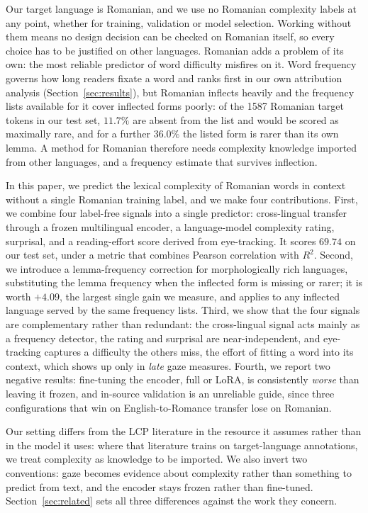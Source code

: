 Our target language is Romanian, and we use no Romanian complexity
labels at any point, whether for training, validation or model
selection. Working without them means no design decision can be checked
on Romanian itself, so every choice has to be justified on other
languages. Romanian adds a problem of its own: the most reliable
predictor of word difficulty misfires on it. Word frequency governs how
long readers fixate a word \citep{rayner1998eye} and ranks first in our
own attribution analysis (Section~\ref{sec:results}), but Romanian
inflects heavily and the frequency lists available for it cover
inflected forms poorly: of the 1587 Romanian target tokens in our test
set, $11.7\%$ are absent from the list and would be scored as maximally
rare, and for a further $36.0\%$ the listed form is rarer than its own
lemma. A method for Romanian therefore needs complexity knowledge
imported from other languages, and a frequency estimate that survives
inflection.

In this paper, we predict the lexical complexity of Romanian words in
context without a single Romanian training label, and we make four
contributions. First, we combine four label-free signals into a single
predictor: cross-lingual transfer through a frozen multilingual encoder,
a language-model complexity rating, surprisal, and a reading-effort
score derived from eye-tracking. It scores $69.74$ on our test set,
under a metric that combines Pearson correlation with $R^2$.
Second, we introduce a lemma-frequency correction for
morphologically rich languages, substituting the lemma frequency when the
inflected form is missing or rarer; it is worth $+4.09$, the largest
single gain we measure, and applies to any inflected language served
by the same frequency lists. Third, we show that the four signals are
complementary rather than redundant: the cross-lingual signal acts mainly
as a frequency detector, the rating and surprisal are near-independent,
and eye-tracking captures a difficulty the others miss, the effort of
fitting a word into its context, which shows up only in \emph{late} gaze
measures.
Fourth, we report two negative results: fine-tuning the encoder, full or
LoRA, is consistently \emph{worse} than leaving it frozen, and in-source
validation is an unreliable guide, since three configurations that win on
English-to-Romance transfer lose on Romanian.

Our setting differs from the LCP literature in the resource it assumes
rather than in the model it uses: where that literature trains on
target-language annotations, we treat complexity as knowledge to be
imported. We also invert two conventions: gaze becomes evidence about
complexity rather than something to predict from text, and the encoder
stays frozen rather than fine-tuned. Section~\ref{sec:related} sets all
three differences against the work they concern.

